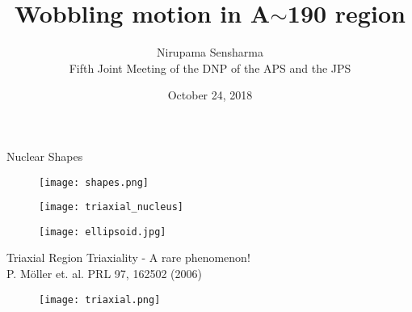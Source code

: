 \documentclass [aspectratio=169]{beamer}
\title{Wobbling motion in A$\sim$190 region}
\author{Nirupama Sensharma \\ 
Fifth Joint Meeting of the DNP of the APS and the JPS}
\date{October 24, 2018}
\institute{University of Notre Dame}
\begin{document}
\maketitle

\begin{frame}{Nuclear Shapes}
\centering
{} \space \space \space \space \space \space \space \space \space \space \space \space \space \space \space \space \space \space \space \space \space \space \space \space \space \space {} \space \space \space \space \space \space \space \space \space \space \space \space \space \space \space \space \space \space \space \space \space \space \space \space \space {}
\begin{figure}
\texttt{[image: shapes.png]}
\end{figure}
\begin{multicols}{2}
\begin{figure}
\hspace{50pt}
\texttt{[image: triaxial\_nucleus]}
\end{figure}
\vspace{-14pt}
\hspace{50pt}
\begin{figure}
\hspace{-30pt}
\texttt{[image: ellipsoid.jpg]}
\end{figure}
\end{multicols}
\end{frame}

\begin{frame}{Triaxial Region}
\centering
Triaxiality - A rare phenomenon!\\
\scriptsize{\color{violet}P. M\"{o}ller et. al. PRL 97, 162502 (2006)}
\begin{figure}
\texttt{[image: triaxial.png]}
\end{figure}
\end{frame}
\end{document}
